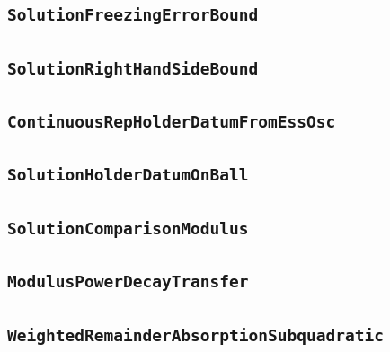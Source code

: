\documentclass[11pt]{amsart}
\theoremstyle{definition}
\begin{document}
\subsection{\texorpdfstring{\texttt{SolutionFreezingErrorBound}}{SolutionFreezingErrorBound}}\label{node:SolutionFreezingErrorBound}


\subsection{\texorpdfstring{\texttt{SolutionRightHandSideBound}}{SolutionRightHandSideBound}}\label{node:SolutionRightHandSideBound}


\subsection{\texorpdfstring{\texttt{ContinuousRepHolderDatumFromEssOsc}}{ContinuousRepHolderDatumFromEssOsc}}\label{node:ContinuousRepHolderDatumFromEssOsc}


\subsection{\texorpdfstring{\texttt{SolutionHolderDatumOnBall}}{SolutionHolderDatumOnBall}}\label{node:SolutionHolderDatumOnBall}


\subsection{\texorpdfstring{\texttt{SolutionComparisonModulus}}{SolutionComparisonModulus}}\label{node:SolutionComparisonModulus}


\subsection{\texorpdfstring{\texttt{ModulusPowerDecayTransfer}}{ModulusPowerDecayTransfer}}\label{node:ModulusPowerDecayTransfer}


\subsection{\texorpdfstring{\texttt{WeightedRemainderAbsorptionSubquadratic}}{WeightedRemainderAbsorptionSubquadratic}}\label{node:WeightedRemainderAbsorptionSubquadratic}

\end{document}
